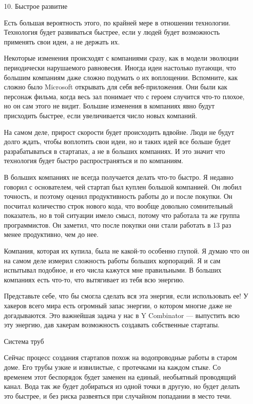 \documentclass[ebook,12pt,oneside,openany]{memoir}
\begin{document}
10. Быстрое развитие

Есть большая вероятность этого, по крайней мере в отношении
технологии. Технология будет развиваться быстрее, если у людей будет
возможность применять свои идеи, а не держать их.

Некоторые изменения происходят с компаниями сразу, как в модели
эволюции периодически нарушаемого равновесия. Иногда идеи настолько
пугающи, что большим компаниям даже сложно подумать о их воплощении.
Вспомните, как сложно было Microsoft открывать для себя
веб-приложения. Они были как персонаж фильма, когда весь зал понимает
что с героем случится что-то плохое, но он сам этого не видит. Большие
изменения в компаниях явно будут присходить быстрее, если
увеличивается число новых компаний.

На самом деле, прирост скорости будет происходить вдвойне. Люди не
будут долго ждать, чтобы воплотить свои идеи, но и таких идей все
больше будет разрабатываться в стартапах, а не в больших компаниях. И
это значит что технология будет быстро распространяться и по
компаниям.

В больших компаниях не всегда получается делать что-то быстро. Я
недавно говорил с основателем, чей стартап был куплен большой
компанией. Он любил точность, и поэтому оценил продуктивность работы
до и после покупки. Он посчитал количество строк нового кода, что
вообще довольно сомнительный показатель, но в той ситуации имело
смысл, потому что работала та же группа программистов. Он заметил, что
после покупки они стали работать в 13 раз менее продуктивно, чем до
нее.

Компания, которая их купила, была не какой-то особенно глупой. Я думаю
что он на самом деле измерил сложность работы больших корпораций. Я и
сам испытывал подобное, и его числа кажутся мне правильными. В больших
компаниях есть что-то, что вытягивает из тебя всю энергию.

Представьте себе, что бы смогла сделать вся эта энергия, если
использовать ее! У хакеров всего мира есть огромный запас энергии, о
котором многие даже не догадываются. Это важнейшая задача у нас в Y
Combinator — выпустить всю эту энергию, дав хакерам возможность
создавать собственные стартапы.

Система труб

Сейчас процесс создания стартапов похож на водопроводные работы в
старом доме. Его трубы узкие и извилистые, с протечками на каждом
стыке. Со временем этот беспорядок будет заменен на единый, необьятный
проводящий канал. Вода так же будет добираться из одной точки в
другую, но будет делать это быстрее, и без риска развеяться при
случайном попадании в место течи.
\end{document}
